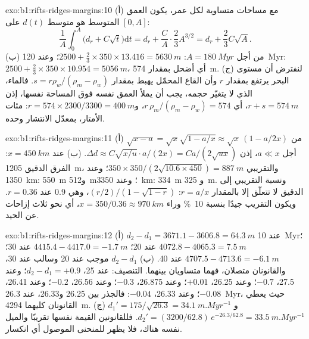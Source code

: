 \begin{solution}{exo:b1:rifts-ridges-margins:10}
(أ) مع مساحات متساوية لكل عمر، يكون العمق المتوسط هو متوسط $d(t)$ على $[0, A]$:
\[
  \frac1A\int_0^A\bigl(d_r + C\sqrt t\bigr)\mathrm dt = d_r + \frac CA\cdot\frac23A^{3/2}
  = d_r + \frac23C\sqrt A.
\]
(ب) من أجل $A = \qty{180}{Myr}$: $2500 + \frac23\times350\times13.416 =
\qty{5630}{m}$؛ وعند \qty{120}{Myr}: $2500 + \frac23\times350\times10.954 =
\qty{5056}{m}$، أي أضحل بمقدار \qty{574}{m}. (ج) لنفترض أن مستوى البحر يرتفع بمقدار $r$ وأن القاع المحمّل يهبط بمقدار $s = r\rho_w/(\rho_m - \rho_w)$. فالماء، الذي لا يتغيّر حجمه، يجب أن يملأ العمق نفسه فوق المساحة نفسها، إذن $r + s = \qty{574}{m}$، أي $r\,\rho_m/(\rho_m - \rho_w) = 574$، و$r = 574\times2300/3300 =
\qty{400}{m}$: مئات الأمتار، بمعدّل الانتشار وحده.
\end{solution}

\begin{solution}{exo:b1:rifts-ridges-margins:11}
(أ) $\sqrt{x - a} = \sqrt x\sqrt{1 - a/x} \approx \sqrt x\,(1 - a/2x)$ من أجل
$a \ll x$، إذن
$\Delta d \approx C\sqrt{x/u}\cdot a/(2x) = Ca/(2\sqrt{ux})$.
(ب) عند $x = \qty{450}{km}$: الفرق الدقيق \qty{1205}{m}، والتقريبي
$350\times350/(2\sqrt{10.6\times450}) = \qty{887}{m}$؛ وعند \qty{1350}{km}:
\qty{550}{m} و\qty{512}{m}؛ وعند \qty{3350}{km}: \qty{334}{m} و
\qty{325}{m}. ونسبة التقريبي إلى الدقيق لا تتعلّق إلا بالمقدار $r = a/x$: $(r/2)/(1 - \sqrt{1 - r})$، وهي 0.9 عند $r = 0.36$. ويكون التقريب جيدًا بنسبة \qty{10}{\percent} وراء $x = 350/0.36 \approx
\qty{970}{km}$، أي نحو ثلاث إزاحات عن الحيد.
\end{solution}

\begin{solution}{exo:b1:rifts-ridges-margins:12}
(أ) $d_2 - d_1 = 3671.1 - 3606.8 = \qty{64.3}{m}$ عند \qty{10}{Myr}؛ $4072.8 - 4065.3 = \qty{7.5}{m}$ عند 20؛ $4415.4 - 4417.0 = \qty{-1.7}{m}$ عند 30؛ $4707.5 - 4713.6 = \qty{-6.1}{m}$ عند 40. (ب) $d_2 - d_1$ موجب عند 20 وسالب عند 30، والقانونان متصلان، فهما متساويان بينهما. التنصيف: عند 25، $d_2 - d_1 = +0.9$؛ وعند 27.5، $-0.7$؛ وعند 26.25، $+0.01$؛ وعند 26.875، $-0.3$؛ وعند 26.56، $-0.2$؛ وعند 26.41، $-0.08$؛ وعند 26.33، $-0.04$: فالجذر بين 26.25 و26.33، عند \qty{26.3}{Myr}، حيث يعطي القانونان كليهما \qty{4294}{m}. (ج) $d_1' = 175/\sqrt{26.3} = \qty{34.1}{m.Myr^{-1}}$ و$d_2' = (3200/62.8)\,e^{-26.3/62.8} = \qty{33.5}{m.Myr^{-1}}$. فللقانونين القيمة نفسها تقريبًا والميل نفسه هناك، فلا يظهر للمنحنى الموصول أي انكسار.
\end{solution}

